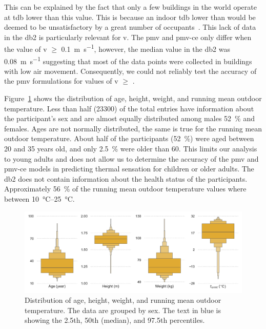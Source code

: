 This can be explained by the fact that only a few buildings in the world operate at \ac{tdb} lower than this value.
This is because an indoor \ac{tdb} lower than  would be deemed to be unsatisfactory by a great number of occupants~\cite{iso7730}.
This lack of data in the \ac{db2} is particularly relevant for \ac{v}.
The \ac{pmv} and \ac{pmv-ce} only differ when the value of \ac{v} $\geq$ \qty{0.1}{\m\per\s}, however, the median value in the \ac{db2} was \qty{0.08}{\m\per\s} suggesting that most of the data points were collected in buildings with low air movement.
Consequently, we could not reliably test the accuracy of the \ac{pmv} formulations for values of \ac{v} $\geq$ .

Figure~\ref{fig:dist_other_data} shows the distribution of age, height, weight, and running mean outdoor temperature.
Less than half (\num{23300}) of the total entries have information about the participant's sex and are almost equally distributed among males \qty{52}{\percent} and females.
Ages are not normally distributed, the same is true for the running mean outdoor temperature.
About half of the participants (\qty{52}{\percent}) were aged between \num{20} and \num{35} years old, and only \qty{2.5}{\percent} were older than 60.
This limits our analysis to young adults and does not allow us to determine the accuracy of the \ac{pmv} and \ac{pmv-ce} models in predicting thermal sensation for children or older adults.
The \ac{db2} does not contain information about the health status of the participants.
Approximately \qty{56}{\percent} of the running mean outdoor temperature values where between \qtyrange{10}{25}{\celsius}.
\begin{figure}[htb!]
    \centering
    \includegraphics[width=\textwidth]{figures/dist_other_data}
    \caption{Distribution of age, height, weight, and running mean outdoor temperature.
    The data are grouped by sex.
    The text in blue is showing the 2.5th, 50th (median), and 97.5th percentiles.}
    \label{fig:dist_other_data}
\end{figure}
